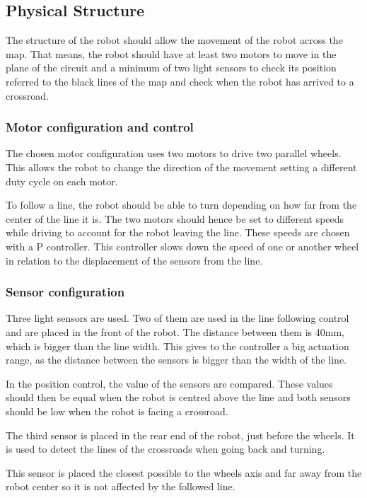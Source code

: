 \subsection{Physical Structure}
The structure of the robot should allow the movement of the robot across the map. 
That means, the robot should have at least two motors to move in the plane of the circuit and a minimum of two light sensors to check its position referred to the black lines of the map and check when the robot has arrived to a crossroad.

\subsubsection{Motor configuration and control}
The chosen motor configuration uses two motors to drive two parallel wheels. 
This allows the robot to change the direction of the movement setting a different duty cycle on each motor.

To follow a line, the robot should be able to turn depending on how far from the center of the line it is.
The two motors should hence be set to different speeds while driving to account for the robot leaving the line.
These speeds are chosen with a P controller.
This controller slows down the speed of one or another wheel in relation to the displacement of the sensors from the line. 


\subsubsection{Sensor configuration}

Three light sensors are used. 
Two of them are used in the line following control and are placed in the front of the robot.
The distance between them is 40mm, which is bigger than the line width.
This gives to the controller a big actuation range, as the distance between the sensors is bigger than the width of the line.

In the position control, the value of the sensors are compared.
These values should then be equal when the robot is centred above the line
and both sensors should be low when the robot is facing a crossroad.

The third sensor is placed in the rear end of the robot, just before the wheels.
It is used to detect the lines of the crossroads when going back and turning.

This sensor is placed the closest possible to the wheels axis and far away from the robot center so it is not affected by the followed line.

